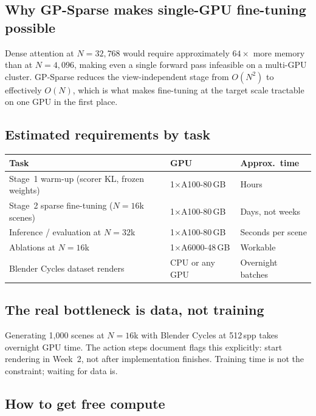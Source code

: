 \documentclass[11pt,letterpaper]{article}
\begin{document}
\subsection*{Why GP-Sparse makes single-GPU fine-tuning possible}

Dense attention at $N = 32{,}768$ would require approximately $64\times$
more memory than at $N = 4{,}096$, making even a single forward pass
infeasible on a multi-GPU cluster.
GP-Sparse reduces the view-independent stage from $O(N^2)$ to effectively
$O(N)$, which is what makes fine-tuning at the target scale tractable on
one GPU in the first place.

\subsection*{Estimated requirements by task}

\begin{center}\small
\renewcommand{\arraystretch}{1.3}
\begin{tabular}{@{}lll@{}}
\toprule
\textbf{Task} & \textbf{GPU} & \textbf{Approx.\ time} \\
\midrule
Stage~1 warm-up (scorer KL, frozen weights) & 1$\times$A100-80\,GB & Hours \\
Stage~2 sparse fine-tuning ($N = 16$k scenes) & 1$\times$A100-80\,GB & Days, not weeks \\
Inference / evaluation at $N = 32$k & 1$\times$A100-80\,GB & Seconds per scene \\
Ablations at $N = 16$k & 1$\times$A6000-48\,GB & Workable \\
Blender Cycles dataset renders & CPU or any GPU & Overnight batches \\
\bottomrule
\end{tabular}
\end{center}

\subsection*{The real bottleneck is data, not training}

Generating 1{,}000 scenes at $N = 16$k with Blender Cycles at 512\,spp
takes overnight GPU time.
The action steps document flags this explicitly: start rendering in Week~2,
not after implementation finishes.
Training time is not the constraint; waiting for data is.

\subsection*{How to get free compute}
\end{document}
